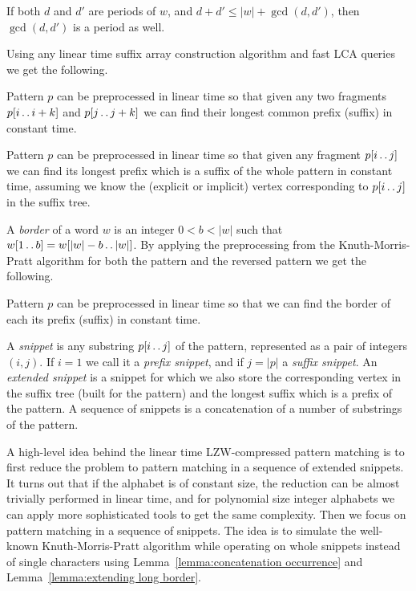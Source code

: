 \documentclass[runningheads]{llncs}
\newcommand{\twodots}{\mathinner{\ldotp\ldotp}}
\begin{document}
\begin{lemma}\label{lemma:periodicity}
If both $d$ and $d'$ are periods of $w$, and $d+d'\leq |w|+\gcd(d,d')$, then $\gcd(d,d')$ is a period as well.
\end{lemma}

Using any linear time suffix array construction algorithm and fast LCA queries~\cite{BenderLCA} we get the following.

\begin{lemma}\label{lemma:equality}
Pattern $p$ can be preprocessed in linear time so that given any two fragments $p[i\twodots i+k]$ and $p[j\twodots j+k]$ we can find their longest common prefix (suffix) in constant time.
\end{lemma}

\begin{lemma}\label{lemma:longest suffix}
Pattern $p$ can be preprocessed in linear time so that given any fragment $p[i\twodots j]$ we can find its longest prefix which is a suffix of the whole pattern in constant time, assuming we know the (explicit or implicit) vertex corresponding to $p[i\twodots j]$ in the suffix tree.
\end{lemma}

A {\it border} of a word $w$ is an integer $0<b<|w|$ such that $w[1\twodots b]=w[|w|-b\twodots |w|]$. By applying the preprocessing from the Knuth-Morris-Pratt algorithm for both the pattern and the reversed pattern we get the following.

\begin{lemma}\label{lemma:borders preprocessing}
Pattern $p$ can be preprocessed in linear time so that we can find the border of each its prefix (suffix) in constant time.
\end{lemma}

A {\it snippet} is any substring $p[i\twodots j]$ of the pattern, represented as a pair of integers $(i,j)$. If $i=1$ we call it a {\it prefix snippet}, and if $j=|p|$ a {\it suffix snippet}. An {\it extended snippet} is a snippet for which we also store the corresponding vertex in the suffix tree 
(built for the pattern) and the longest suffix which is a prefix of the pattern. A sequence of snippets is a concatenation of a number of substrings of the pattern.

A high-level idea behind the linear time LZW-compressed pattern matching is to first reduce the problem to pattern matching in a sequence of extended snippets. It turns out that if the alphabet is of constant size, the reduction can be almost trivially performed in linear time, and for polynomial size integer alphabets we can apply more sophisticated tools to get the same complexity. Then we focus on pattern matching in a sequence of snippets. The idea is to simulate the well-known Knuth-Morris-Pratt algorithm while operating on whole snippets instead of single characters using Lemma~\ref{lemma:concatenation occurrence} and Lemma~\ref{lemma:extending long border}.
\end{document}
